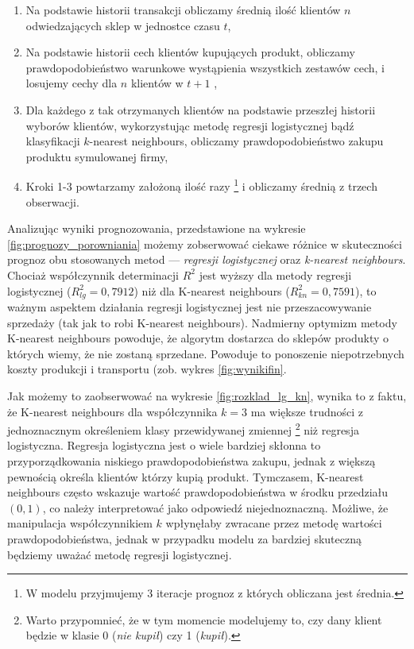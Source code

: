 \documentclass[polish, twoside, 12pt, a4paper]{article}
\theoremstyle{definition}
\theoremstyle{plain}
\theoremstyle{remark}
\begin{document}
\begin{enumerate}
	\item Na podstawie historii transakcji obliczamy średnią ilość klientów $n$ odwiedzających sklep w jednostce czasu $t$,
	\item Na podstawie historii cech klientów kupujących produkt, obliczamy prawdopodobieństwo warunkowe wystąpienia wszystkich zestawów cech, i losujemy cechy dla $n$ klientów w $t+1$ ,
	\item Dla każdego z tak otrzymanych klientów na podstawie przeszłej historii wyborów klientów, wykorzystując metodę regresji logistycznej bądź klasyfikacji $k$-nearest neighbours, obliczamy prawdopodobieństwo zakupu produktu symulowanej firmy,
	\item Kroki 1-3 powtarzamy założoną ilość razy \footnote{W modelu przyjmujemy 3 iteracje prognoz z których obliczana jest średnia.} i obliczamy średnią z trzech obserwacji.
\end{enumerate} 

Analizując wyniki prognozowania, przedstawione na wykresie \ref{fig:prognozy_porowniania} możemy zobserwować ciekawe różnice w skuteczności prognoz obu stosowanych metod --- \textit{regresji logistycznej} oraz \textit{k-nearest neighbours}. Chociaż współczynnik determinacji $R^2$ jest wyższy dla metody regresji logistycznej ($R_{lg}^2 = 0,7912$) niż dla K-nearest neighbours ($R_{kn}^2 = 0,7591$), to ważnym aspektem działania regresji logistycznej jest nie przeszacowywanie sprzedaży (tak jak to robi K-nearest neighbours). Nadmierny optymizm metody K-nearest neighbours powoduje, że algorytm dostarzca do sklepów produkty o których wiemy, że nie zostaną sprzedane. Powoduje to ponoszenie niepotrzebnych koszty produkcji i transportu (zob. wykres \ref{fig:wynikifin}. 

Jak możemy to zaobserwować na wykresie \ref{fig:rozklad_lg_kn}, wynika to z faktu, że K-nearest neighbours dla współczynnika $k=3$ ma większe trudności z jednoznacznym określeniem klasy przewidywanej zmiennej \footnote{Warto przypomnieć, że w tym momencie modelujemy to, czy dany klient będzie w klasie 0 (\textit{nie kupił}) czy 1 (\textit{kupił}).} niż regresja logistyczna. Regresja logistyczna jest o wiele bardziej skłonna to przyporządkowania niskiego prawdopodobieństwa zakupu, jednak z większą pewnością określa klientów którzy kupią produkt. Tymczasem, K-nearest neighbours często wskazuje wartość prawdopodobieństwa w środku przedziału $(0,1)$, co należy interpretować jako odpowiedź niejednoznaczną. Możliwe, że manipulacja współczynnikiem $k$ wpłynęłaby zwracane przez metodę wartości prawdopodobieństwa, jednak w przypadku modelu za bardziej skuteczną będziemy uważać metodę regresji logistycznej. 
\end{document}

